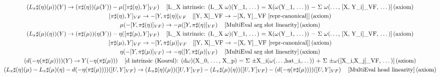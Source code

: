 \documentclass[11pt]{article}
\begin{document}
{\begin{gather*}
\left(L_\pi\sharp(\eta)\!\left(\mu\right)\right)\!\left(Y\right) \to \left(\pi\sharp\!\left(\eta\right)\right)\!\left(\mu\!\left(Y\right)\right) - \mu\!\left([\pi\sharp(\eta),Y]_{VF}\right) \quad \text{[L\_X intrinsic: (L\_X \ensuremath{\omega})(Y\_1, \ensuremath{\dots}) = X(\ensuremath{\omega}(Y\_1, \ensuremath{\dots})) \ensuremath{-} \ensuremath{\Sigma} \ensuremath{\omega}(\ensuremath{\dots}, [X, Y\_i]\_VF, \ensuremath{\dots})]\,(axiom)} \\
[\pi\sharp(\eta),Y]_{VF} \to -[Y,\pi\sharp(\eta)]_{VF} \quad \text{[[Y, X]\_VF \ensuremath{\to} \ensuremath{-}[X, Y]\_VF  [repr-canonical]]\,(axiom)} \\
\mu\!\left(-[Y,\pi\sharp(\eta)]_{VF}\right) \to -\mu\!\left([Y,\pi\sharp(\eta)]_{VF}\right) \quad \text{[MultiEval arg slot linearity]\,(axiom)} \\
\left(L_\pi\sharp(\mu)\!\left(\eta\right)\right)\!\left(Y\right) \to \left(\pi\sharp\!\left(\mu\right)\right)\!\left(\eta\!\left(Y\right)\right) - \eta\!\left([\pi\sharp(\mu),Y]_{VF}\right) \quad \text{[L\_X intrinsic: (L\_X \ensuremath{\omega})(Y\_1, \ensuremath{\dots}) = X(\ensuremath{\omega}(Y\_1, \ensuremath{\dots})) \ensuremath{-} \ensuremath{\Sigma} \ensuremath{\omega}(\ensuremath{\dots}, [X, Y\_i]\_VF, \ensuremath{\dots})]\,(axiom)} \\
[\pi\sharp(\mu),Y]_{VF} \to -[Y,\pi\sharp(\mu)]_{VF} \quad \text{[[Y, X]\_VF \ensuremath{\to} \ensuremath{-}[X, Y]\_VF  [repr-canonical]]\,(axiom)} \\
\eta\!\left(-[Y,\pi\sharp(\mu)]_{VF}\right) \to -\eta\!\left([Y,\pi\sharp(\mu)]_{VF}\right) \quad \text{[MultiEval arg slot linearity]\,(axiom)} \\
\left(d\!\left(-\eta\!\left(\pi\sharp\!\left(\mu\right)\right)\right)\right)\!\left(Y\right) \to Y\!\left(-\eta\!\left(\pi\sharp\!\left(\mu\right)\right)\right) \quad \text{[d intrinsic (Koszul): (d\ensuremath{\omega})(X\_0, \ensuremath{\dots}, X\_p) = \ensuremath{\Sigma} \ensuremath{\pm}X\_i(\ensuremath{\omega}(\ensuremath{\dots},hat\_i,\ensuremath{\dots})) + \ensuremath{\Sigma} \ensuremath{\pm}\ensuremath{\omega}([X\_i,X\_j]\_VF, \ensuremath{\dots})]\,(axiom)} \\
\left(L_\pi\sharp(\eta)\!\left(\mu\right) - L_\pi\sharp(\mu)\!\left(\eta\right) - d\!\left(-\eta\!\left(\pi\sharp\!\left(\mu\right)\right)\right)\right)\!\left([U,Y]_{VF}\right) \to \left(L_\pi\sharp(\eta)\!\left(\mu\right)\right)\!\left([U,Y]_{VF}\right) - \left(L_\pi\sharp(\mu)\!\left(\eta\right)\right)\!\left([U,Y]_{VF}\right) - \left(d\!\left(-\eta\!\left(\pi\sharp\!\left(\mu\right)\right)\right)\right)\!\left([U,Y]_{VF}\right) \quad \text{[MultiEval head linearity]\,(axiom)} \\

\end{gather*}}
\end{document}

